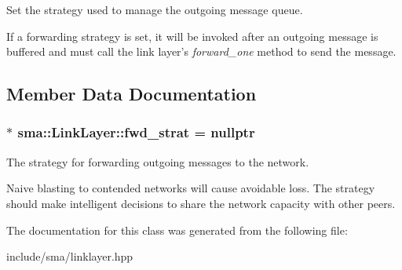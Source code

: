 Set the strategy used to manage the outgoing message queue. 

If a forwarding strategy is set, it will be invoked after an outgoing message is buffered and must call the link layer's {\itshape forward\-\_\-one} method to send the message. 

\subsection{Member Data Documentation}
\hypertarget{classsma_1_1LinkLayer_abc5610d847fa48661a6ee79d6872181b}{
\subsubsection[{fwd\-\_\-strat}]{$\ast$ sma\-::\-Link\-Layer\-::fwd\-\_\-strat = nullptr\hspace{0.3cm}{\ttfamily [protected]}}}\label{classsma_1_1LinkLayer_abc5610d847fa48661a6ee79d6872181b}


The strategy for forwarding outgoing messages to the network. 

Naive blasting to contended networks will cause avoidable loss. The strategy should make intelligent decisions to share the network capacity with other peers. 

The documentation for this class was generated from the following file\-:\begin{DoxyCompactItemize}
\item 
include/sma/linklayer.\-hpp\end{DoxyCompactItemize}
